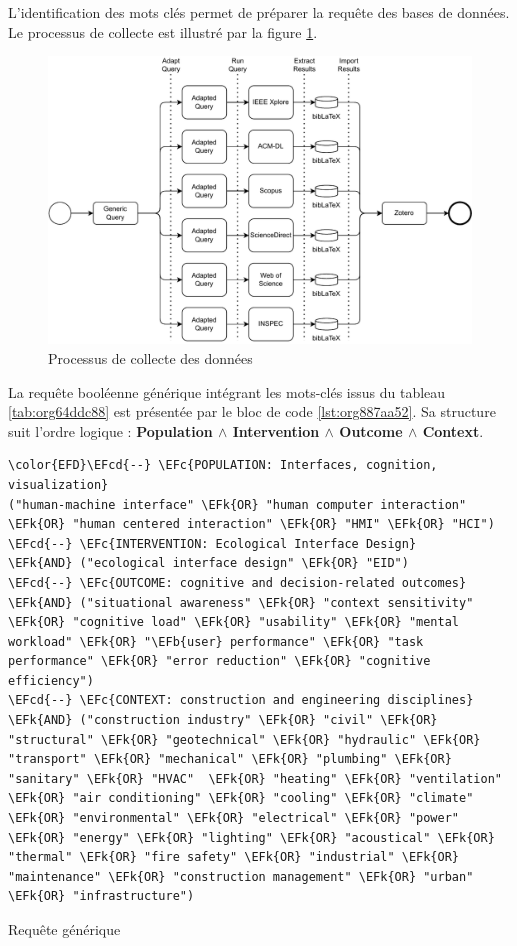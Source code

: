 \documentclass[11pt]{article}
\newcommand{\EFc}[1]{\textcolor{EFc}{#1}} %
\newcommand{\EFcd}[1]{\textcolor{EFcd}{#1}} %
\newcommand{\EFk}[1]{\textcolor{EFk}{#1}} %
\newcommand{\EFb}[1]{\textcolor{EFb}{#1}} %
\begin{document}
L'identification des mots clés permet de préparer la requête des bases de données. Le processus de collecte est illustré par la figure \ref{fig:org071c30a}.

\begin{figure}[htbp]
\centering
\includegraphics[width=.9\linewidth]{./svg/slr-data-collect.pdf}
\caption{\label{fig:org071c30a}Processus de collecte des données}
\end{figure}

La requête booléenne générique intégrant les mots-clés issus du tableau \ref{tab:org64ddc88} est présentée par le bloc de code \ref{lst:org887aa52}. Sa structure suit l’ordre logique : \textbf{Population \(\land\) Intervention \(\land\) Outcome \(\land\) Context}.

\begin{listing}[htbp]
\begin{Code}
\begin{Verbatim}
\color{EFD}\EFcd{--} \EFc{POPULATION: Interfaces, cognition, visualization}
("human-machine interface" \EFk{OR} "human computer interaction" \EFk{OR} "human centered interaction" \EFk{OR} "HMI" \EFk{OR} "HCI")
\EFcd{--} \EFc{INTERVENTION: Ecological Interface Design}
\EFk{AND} ("ecological interface design" \EFk{OR} "EID")
\EFcd{--} \EFc{OUTCOME: cognitive and decision-related outcomes}
\EFk{AND} ("situational awareness" \EFk{OR} "context sensitivity" \EFk{OR} "cognitive load" \EFk{OR} "usability" \EFk{OR} "mental workload" \EFk{OR} "\EFb{user} performance" \EFk{OR} "task performance" \EFk{OR} "error reduction" \EFk{OR} "cognitive efficiency")
\EFcd{--} \EFc{CONTEXT: construction and engineering disciplines}
\EFk{AND} ("construction industry" \EFk{OR} "civil" \EFk{OR} "structural" \EFk{OR} "geotechnical" \EFk{OR} "hydraulic" \EFk{OR} "transport" \EFk{OR} "mechanical" \EFk{OR} "plumbing" \EFk{OR} "sanitary" \EFk{OR} "HVAC"  \EFk{OR} "heating" \EFk{OR} "ventilation" \EFk{OR} "air conditioning" \EFk{OR} "cooling" \EFk{OR} "climate" \EFk{OR} "environmental" \EFk{OR} "electrical" \EFk{OR} "power" \EFk{OR} "energy" \EFk{OR} "lighting" \EFk{OR} "acoustical" \EFk{OR} "thermal" \EFk{OR} "fire safety" \EFk{OR} "industrial" \EFk{OR} "maintenance" \EFk{OR} "construction management" \EFk{OR} "urban" \EFk{OR} "infrastructure")
\end{Verbatim}
\end{Code}
\caption{\label{lst:org887aa52}Requête générique}
\end{listing}
\end{document}

